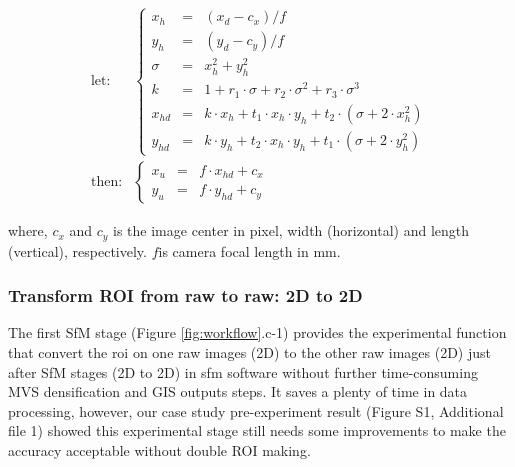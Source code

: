 \documentclass{configs/bmcart}
\begin{document}
\begin{align}
  \label{eq:px_correct}
  \text{let:} &
  \left\{\begin{array}{lll}
    x_h & = & (x_d - c_x) / f \\
    y_h & = & (y_d - c_y) / f \\
    \sigma & = & x_h^2 + y_h^2 \\
    k      & = & 1 + r_1 \cdot \sigma + r_2 \cdot \sigma^2 + r_3 \cdot \sigma^3 \\
    x_{hd} & = & k \cdot x_h + t_1 \cdot x_h \cdot y_h + t_2 \cdot (\sigma + 2 \cdot x_h^2) \\
    y_{hd} & = & k \cdot y_h + t_2 \cdot x_h \cdot y_h + t_1 \cdot (\sigma + 2 \cdot y_h^2)
  \end{array} \right. \nonumber \\
  \text{then:} &
  \left\{\begin{array}{lll}
    x_u & = & f \cdot x_{hd} + c_x \\
    y_u & = & f \cdot y_{hd} + c_y
  \end{array} \right.
\end{align}

where, $c_x$ and $c_y$ is the image center in pixel, width (horizontal) and length (vertical), respectively. $f$is camera focal length in mm. 

\subsubsection*{Transform ROI from raw to raw: 2D to 2D}
The first SfM stage (Figure \ref{fig:workflow}.c-1) provides the experimental function that convert the \acrfull*{roi} on one raw images (2D) to the other raw images (2D) just after SfM stages (2D to 2D) in \acrlong*{sfm} software without further time-consuming MVS densification and GIS outputs steps. It saves a plenty of time in data processing, however, our case study pre-experiment result (Figure S1, Additional file 1) showed this experimental stage still needs some improvements to make the accuracy acceptable without double ROI making.
\end{document}
